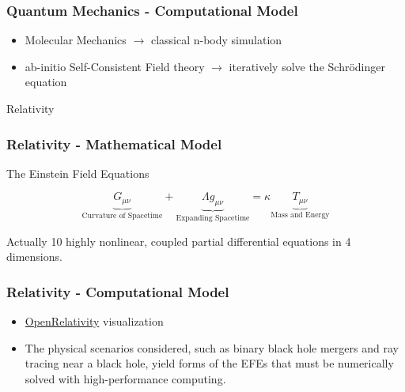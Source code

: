 \documentclass{beamer}
\begin{document}
\begin{frame}
    \frametitle{Quantum Mechanics - Computational Model}

    \begin{itemize}
        \item Molecular Mechanics $\to$ classical n-body simulation
        \item ab-initio Self-Consistent Field theory $\to$ iteratively solve the Schr{\"o}dinger equation
    \end{itemize}

\end{frame}

\begin{frame}

    \begin{block}{}
        \centering \Large Relativity
    \end{block}

\end{frame}

\begin{frame}
    \frametitle{Relativity - Mathematical Model}

    \centering The Einstein Field Equations

    \begin{equation}
        \underbrace{G_{\mu \nu}}_\text{Curvature of Spacetime} + \underbrace{\Lambda g_{\mu \nu}}_\text{Expanding Spacetime} = \kappa \underbrace{T_{\mu \nu}}_\text{Mass and Energy}
    \end{equation}

    Actually 10 highly nonlinear, coupled partial differential equations in 4 dimensions.

\end{frame}

\begin{frame}
    \frametitle{Relativity - Computational Model}

    \begin{itemize}
        \item \href{https://youtu.be/qol-zP9W5J4?si=7ty4vfO9ceFox48e}{OpenRelativity} visualization\cite{openrelativity}
        \item The physical scenarios considered, such as binary black hole mergers\cite{blackholemerger} and ray tracing near a black hole\cite{James_2015}, yield forms of the EFEs that must be numerically solved with high-performance computing\cite{li2023solving,Andrade2021,Clough_2015}.
    \end{itemize}

\end{frame}
\end{document}
